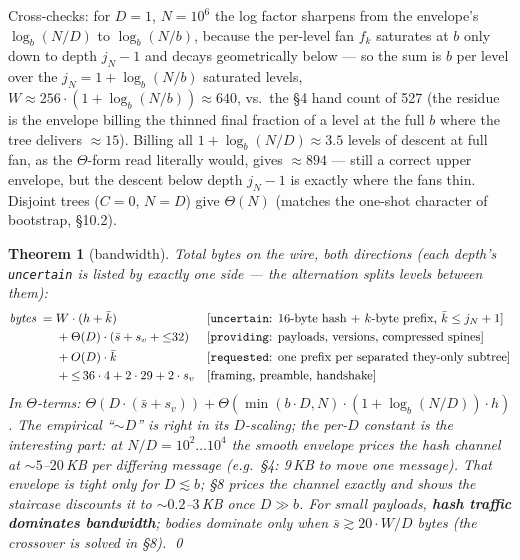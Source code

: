 \documentclass[11pt]{article}
\newcommand{\code}[1]{\texttt{#1}}
\theoremstyle{plain}
\newtheorem{theorem}{Theorem}
\begin{document}
Cross-checks: for $D = 1$, $N = 10^6$ the log factor sharpens from the
envelope's $\log_b(N/D)$ to $\log_b(N/b)$, because the per-level fan $f_k$
saturates at $b$ only down to depth $j_N - 1$ and decays geometrically
below --- so the sum is $b$ per level over the $j_N = 1 + \log_b(N/b)$
saturated levels, $W \approx 256 \cdot (1 + \log_b(N/b)) \approx 640$, vs.\
the \S4 hand count of 527 \checkmark{} (the residue is the envelope billing
the thinned final fraction of a level at the full $b$ where the tree
delivers ${\approx}15$). Billing all $1 + \log_b(N/D) \approx 3.5$ levels of
descent at full fan, as the $\Theta$-form read literally would, gives
${\approx}894$ --- still a correct upper envelope, but the descent below
depth $j_N - 1$ is exactly where the fans thin. Disjoint trees ($C = 0$,
$N = D$) give $\Theta(N)$ \checkmark{} (matches the one-shot character of
bootstrap, \S10.2).

\begin{theorem}[bandwidth]
Total bytes on the wire, both directions (each depth's \code{uncertain} is
listed by exactly one side --- the alternation splits levels between them):
\begin{align*}
\textit{bytes} \;=\;& W \cdot (h + \bar{k})
  && \text{[\code{uncertain}: 16-byte hash + $k$-byte prefix, $\bar{k} \le j_N + 1$]} \\
  &+ \Theta(D) \cdot (\bar{s} + s_v + {\le}32)
  && \text{[\code{providing}: payloads, versions, compressed spines]} \\
  &+ O(D) \cdot \bar{k}
  && \text{[\code{requested}: one prefix per separated they-only subtree]} \\
  &+ {\le}\, 36 \cdot 4 + 2 \cdot 29 + 2 \cdot s_v
  && \text{[framing, preamble, handshake]}
\end{align*}
In $\Theta$-terms:
$\Theta(D \cdot (\bar{s} + s_v))
 + \Theta(\min(b \cdot D, N) \cdot (1 + \log_b(N/D)) \cdot h)$.
The empirical ``${\sim}D$'' is right in its $D$-scaling; the per-$D$
constant is the interesting part: at $N/D = 10^2 \dots 10^4$ the smooth
envelope prices the hash channel at ${\sim}5$--$20$\,KB \emph{per
differing message} (e.g.\ \S4: 9\,KB to move one message). That envelope
is tight only for $D \lesssim b$; \S8 prices the channel exactly and shows
the staircase discounts it to ${\sim}0.2$--$3$\,KB once $D \gg b$. For
small payloads, \textbf{hash traffic dominates bandwidth}; bodies dominate
only when $\bar{s} \gtrsim 20 \cdot W/D$ bytes (the crossover is solved in
\S8). \qed
\end{theorem}
\end{document}
